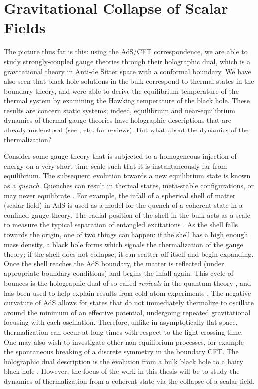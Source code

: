\documentclass[../PhD.tex]{subfiles}
\begin{document}
\section{Gravitational Collapse of Scalar Fields}
\label{sec: grav collapse}

The picture thus far is this: using the AdS/CFT correspondence, we are able to study strongly-coupled gauge theories through their holographic dual, which is a gravitational theory in Anti-de Sitter space with a conformal boundary. We have also seen that black hole solutions in the bulk correspond to thermal states in the boundary theory, and were able to derive the equilibrium temperature of the thermal system by examining the Hawking temperature of the black hole. These results are concern static systems; indeed, equilibrium and near-equilibrium dynamics of thermal gauge theories have holographic descriptions that are already understood (see \cite{1101.0618}, etc. for reviews). But what about the dynamics of the thermalization? 

Consider some gauge theory that is subjected to a homogeneous injection of energy on a very short time scale such that it is instantaneously far from equilibrium. The subsequent evolution towards a new equilibrium state is known as a \emph{quench}. Quenches can result in thermal states, meta-stable configurations, or may never equilibrate \cite{1103.2683}. For example, the infall of a spherical shell of matter (scalar field) in AdS is used as a model for the quench of a coherent state in a confined gauge theory. The radial position of the shell in the bulk acts as a scale to measure the typical separation of entangled excitations \cite{0705.0016}. As the shell falls towards the origin, one of two things can happen: if the shell has a high enough mass density, a black hole forms which signals the thermalization of the gauge theory; if the shell does not collapse, it can scatter off itself and begin expanding. Once the shell reaches the AdS boundary, the matter is reflected (under appropriate boundary conditions) and begins the infall again. This cycle of bounces is the holographic dual of so-called \emph{revivals} in the quantum theory \cite{1410.6201, 1412.6002}, and has been used to help explain results from cold atom experiments \cite{Dziarmaga2010, 2011arXiv1106.3567L}. The negative curvature of AdS allows for states that do not immediately thermalize to oscillate around the minimum of an effective potential, undergoing repeated gravitational focusing with each oscillation. Therefore, unlike in asymptotically flat space, thermalization can occur at long times with respect to the light crossing time. One may also wish to investigate other non-equilibrium processes, for example the spontaneous breaking of a discrete symmetry in the boundary CFT. The holographic dual description is the evolution from a bulk black hole to a hairy black hole \cite{1704.05454, 1902.08669}. However, the focus of the work in this thesis will be to study the dynamics of thermalization from a coherent state via the collapse of a scalar field.
\end{document}
